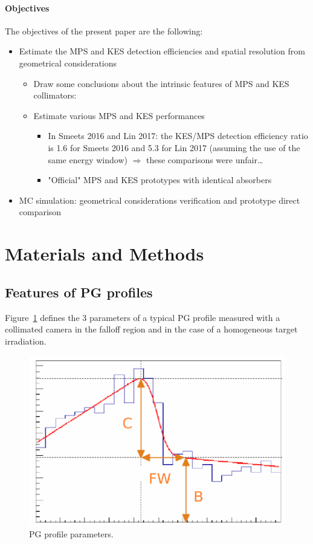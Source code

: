 \documentclass[a4paper,english]{article}
\begin{document}
\paragraph{Objectives}
The objectives of the present paper are the following:

\begin{itemize}
  \item Estimate the MPS and KES detection efficiencies and spatial resolution from geometrical considerations
  \begin{itemize}
    \item Draw some conclusions about the intrinsic features of MPS and KES collimators:  
    \item Estimate various MPS and KES performances 
    \begin{itemize}
    	\item In Smeets 2016 and Lin 2017: the KES/MPS detection efficiency ratio is 1.6 for Smeets 2016 and 5.3 for Lin 2017 (assuming the use of the same energy window) $\Rightarrow$ these comparisons were unfair\dots    
        \item "Official" MPS and KES prototypes with identical absorbers 
    \end{itemize}    
  \end{itemize}
  \item MC simulation: geometrical considerations verification and prototype direct comparison
\end{itemize}  


\section{Materials and Methods}


\subsection{Features of PG profiles}

Figure~\ref{ProfileParameters} defines the 3 parameters of a typical PG profile measured with a collimated camera in the falloff region and in the case of a homogeneous target irradiation.

\begin{figure}[htp]
  \centering
  \includegraphics[width=.45\textwidth]{ProfileParameters}
  \caption{\label{ProfileParameters} PG profile parameters.}
\end{figure} 
\end{document}
